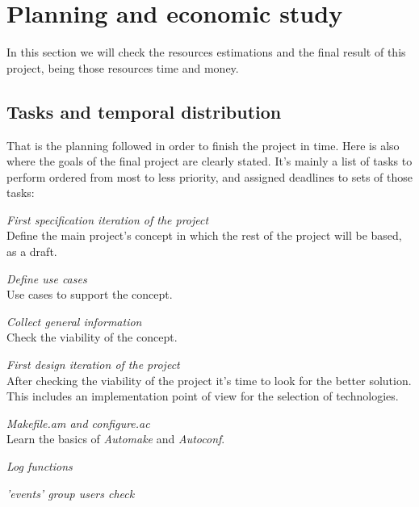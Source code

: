 \chapter{Planning and economic study}
In this section we will check the resources estimations and the final result of this project, being those resources time and money.
\section{Tasks and temporal distribution}
\label{sec:tasks}
That is the planning followed in order to finish the project in time. Here is also where the goals of the final project are clearly 
stated. It's mainly a list of tasks to perform ordered from most to less priority, and assigned deadlines to sets of those tasks:\\
\begin{list}{-}{December 10th, 2011 ({\bf 60 days})}
  \item \emph{First specification iteration of the project}\\
    Define the main project's concept in which the rest of the project will be based, as a draft.
  \item \emph{Define use cases}\\
    Use cases to support the concept.
  \item \emph{Collect general information}\\
    Check the viability of the concept.
\end{list}
\begin{list}{-}{January 26th, 2012 ({\bf 16 days})}
  \item \emph{First design iteration of the project}\\
    After checking the viability of the project it's time to look for the better solution. This includes an implementation point of view
    for the selection of technologies.
\end{list}
\begin{list}{-}{February 2nd, 2012 ({\bf 7 days})}
  \item \emph{Makefile.am and configure.ac}\\
    Learn the basics of \emph{Automake} and \emph{Autoconf}.
  \item \emph{Log functions}
  \item \emph{'events' group users check}
\end{list}
